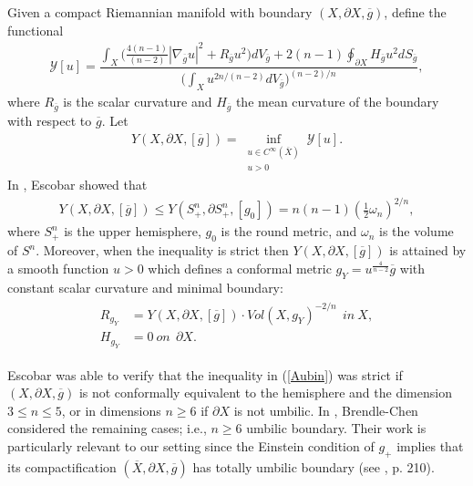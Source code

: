 \documentclass{amsart}
\theoremstyle{definition}
\theoremstyle{remark}
\numberwithin{equation}{section}
\begin{document}
Given a compact Riemannian manifold with boundary $(X, \partial X, \overline{g})$, define the functional %
\begin{align*} %
\mathcal{Y}[u] = \dfrac{ \int_{X} \big( \frac{4(n-1)}{(n-2)} |\nabla_{\overline{g}} u|^2 + R_{\overline{g}} u^2 \big)dV_{\overline{g}} + 2 (n-1) \oint_{\partial X} H_{\overline{g}} u^2 dS_{\overline{g}} }{\Big( \int_{X} u^{2n/(n-2)} dV_{\overline{g}} \Big)^{(n-2)/n}},
\end{align*}
where $R_{\overline{g}}$ is the scalar curvature and $H_{\overline{g}}$ the mean curvature of the boundary with respect to $\overline{g}$.  Let
\begin{align} \label{YXMdef}
Y(X,\partial X, [\overline{g}]) = \inf_{\substack{u \in C^{\infty}(\overline{X}) \\ u > 0}} \mathcal{Y}[u].   %
\end{align}
In \cite{EscobarJDG}, Escobar showed that
\begin{align} \label{Aubin}
Y(X,\partial X,[\overline{g}]) \leq Y(S^n_{+}, \partial S^n_{+}, [g_0]) = n(n-1)(\frac{1}{2}\omega_n)^{2/n},
\end{align}
where $S^n_{+}$ is the upper hemisphere, $g_0$ is the round metric, and $\omega_n$ is the volume of $S^n$.  Moreover, when the inequality is strict then $Y(X,\partial X, [\overline{g}])$ is attained by a smooth function $u > 0$ which defines a conformal metric $g_Y = u^{\frac{4}{n-2}}\overline{g}$ with constant scalar curvature and minimal boundary:
\begin{align} \label{bdyYamabe} \begin{split}
R_{g_Y} &= Y(X,\partial X,[\overline{g}])\cdot  Vol(X,g_Y)^{-2/n} \ \ in \ X, \\
H_{g_Y} &= 0\ on \ \ \partial X.
\end{split}
\end{align}

Escobar was able to verify that the inequality in (\ref{Aubin}) was strict if $(X,\partial X, \overline{g})$ is not conformally equivalent to the hemisphere and the dimension $3 \leq n \leq 5$, or in dimensions $n \geq 6$ if $\partial X$ is not umbilic. In \cite{BC}, Brendle-Chen considered the remaining cases; i.e., $n \geq 6$ umbilic boundary.  Their work is particularly relevant to our setting since the Einstein condition of $g_{+}$ implies that its compactification $(\overline{X},\partial X, \overline{g})$ has totally umbilic boundary (see \cite{AndersonAM}, p. 210).
\end{document}
